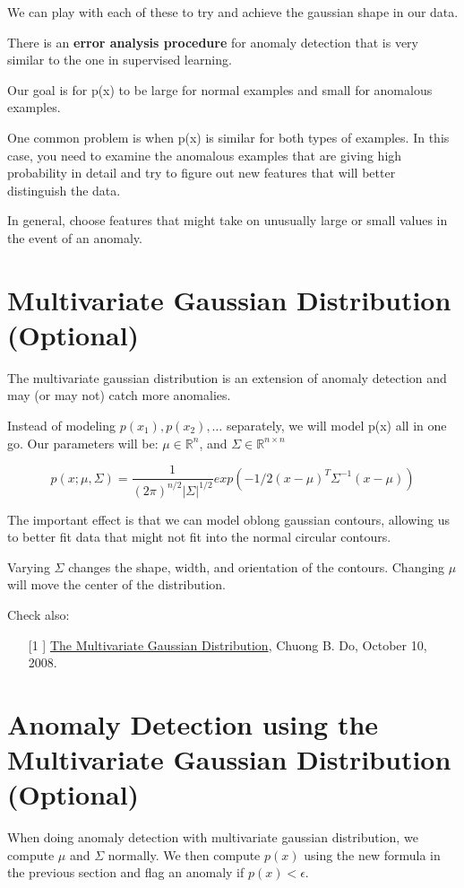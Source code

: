 We can play with each of these to try and achieve the gaussian shape in our data.

There is an \textbf{error analysis procedure} for anomaly detection that is very similar to the one in supervised learning.

Our goal is for p(x) to be large for normal examples and small for anomalous examples.

One common problem is when p(x) is similar for both types of examples. In this case, you need to examine the anomalous examples that are giving high probability in detail and try to figure out new features that will better distinguish the data.

In general, choose features that might take on unusually large or small values in the event of an anomaly.

\section{Multivariate Gaussian Distribution (Optional)}
The multivariate gaussian distribution is an extension of anomaly detection and may (or may not) catch more anomalies.

Instead of modeling $p(x_1),p(x_2),\dots$ separately, we will model p(x) all in one go. Our parameters will be: $\mu \in \mathbb{R}^n$, and $\Sigma \in \mathbb{R}^{n \times n}$

\begin{equation}
p(x;\mu,\Sigma) = \dfrac{1}{(2\pi)^{n/2} |\Sigma|^{1/2}} exp(-1/2(x-\mu)^T\Sigma^{-1}(x-\mu))
\end{equation}

The important effect is that we can model oblong gaussian contours, allowing us to better fit data that might not fit into the normal circular contours.

Varying $\Sigma$ changes the shape, width, and orientation of the contours. Changing $\mu$ will move the center of the distribution.

Check also:
\begin{itemize}
\item[[1]] \href{http://cs229.stanford.edu/section/gaussians.pdf}{The Multivariate Gaussian Distribution}, Chuong B. Do, October 10, 2008.
\end{itemize}

\section{Anomaly Detection using the Multivariate Gaussian Distribution (Optional)}
When doing anomaly detection with multivariate gaussian distribution, we compute $\mu$ and $\Sigma$ normally. We then compute $p(x)$ using the new formula in the previous section and flag an anomaly if $p(x) < \epsilon$.

